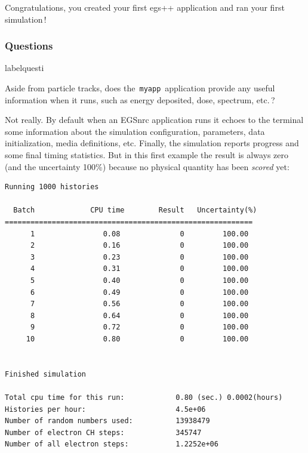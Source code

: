 \documentclass[12pt,twoside]{article}
\makeatletter
\renewcommand\thequesti         {\@arabic\c@questi}
\newenvironment{question}{
    \bfseries
    \edef\@questictr{questi}
    \expandafter
    \list \csname label\@questictr\endcsname {
        \usecounter\@questictr\def\makelabel##1{\hss\llap{##1}}
        \savebox{\questbox}             {\thequesti}
        \setlength\labelsep             {0.6em}
        \setlength\labelwidth           {\wd\questbox}
        \setlength\leftmargini          {\labelwidth}
        \addtolength{\leftmargini}      {\labelsep}
        \addtolength{\leftmargini}      {0.2em}
        \leftmargin\leftmargini
        \setlength\topsep               {1em}
        \setlength\itemsep              {1.2em}
        \setlength\parsep               {0.5em}
    }
}{\normalfont\endlist}
\newenvironment{answer}{\normalfont}{\relax}
\makeatother
\begin{document}
Congratulations, you created your first egs++ application and ran
your first simulation\,!

\subsubsection{Questions}

\begin{question}
\item Aside from particle tracks, does the \,\Verb+myapp+\, application
provide any useful information when it runs, such as energy deposited,
dose, spectrum, etc.\,?

\begin{answer}
Not really. By default when an EGSnrc application runs it echoes to the
terminal some information about the simulation configuration,
parameters, data initialization, media definitions, etc. Finally, the
simulation reports progress and some final timing statistics. But in
this first example the result is always zero (and the uncertainty 100\%)
because no physical quantity has been \textit{scored} yet:

{\scriptsize
\begin{lstlisting}[language={},backgroundcolor=\color{white}]
Running 1000 histories

  Batch             CPU time        Result   Uncertainty(%)
==========================================================
      1                0.08              0         100.00
      2                0.16              0         100.00
      3                0.23              0         100.00
      4                0.31              0         100.00
      5                0.40              0         100.00
      6                0.49              0         100.00
      7                0.56              0         100.00
      8                0.64              0         100.00
      9                0.72              0         100.00
     10                0.80              0         100.00


Finished simulation

Total cpu time for this run:            0.80 (sec.) 0.0002(hours)
Histories per hour:                     4.5e+06
Number of random numbers used:          13938479
Number of electron CH steps:            345747
Number of all electron steps:           1.2252e+06
\end{lstlisting}
}
\end{answer}

\end{question}
\end{document}
